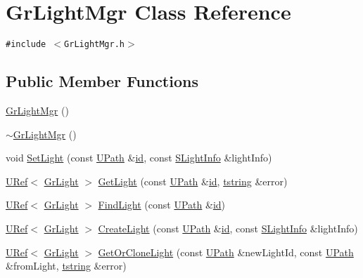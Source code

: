 \hypertarget{class_gr_light_mgr}{
\section{GrLightMgr Class Reference}
\label{class_gr_light_mgr}
}
{\tt \#include $<$GrLightMgr.h$>$}

\subsection*{Public Member Functions}
\begin{CompactItemize}
\item 
\hyperlink{class_gr_light_mgr_ea373f5ff2835f15c63767346023affa}{GrLightMgr} ()
\item 
\hyperlink{class_gr_light_mgr_61c1067fe1f0e57314c28363fb6a4d8b}{$\sim$GrLightMgr} ()
\item 
void \hyperlink{class_gr_light_mgr_aa93ff46c80e5fdbc8cecdfce13d5a99}{SetLight} (const \hyperlink{class_u_path}{UPath} \&\hyperlink{glext__bak_8h_58c2a664503e14ffb8f21012aabff3e9}{id}, const \hyperlink{struct_s_light_info}{SLightInfo} \&lightInfo)
\item 
\hyperlink{class_u_ref}{URef}$<$ \hyperlink{class_gr_light}{GrLight} $>$ \hyperlink{class_gr_light_mgr_6e2d2113c8d6092935f4f39ad9e1388d}{GetLight} (const \hyperlink{class_u_path}{UPath} \&\hyperlink{glext__bak_8h_58c2a664503e14ffb8f21012aabff3e9}{id}, \hyperlink{common__afx_8h_816fa58fd77499b0edb2c69ebe803d5c}{tstring} \&error)
\item 
\hyperlink{class_u_ref}{URef}$<$ \hyperlink{class_gr_light}{GrLight} $>$ \hyperlink{class_gr_light_mgr_8d8c949784428299e9046f856f48cda4}{FindLight} (const \hyperlink{class_u_path}{UPath} \&\hyperlink{glext__bak_8h_58c2a664503e14ffb8f21012aabff3e9}{id})
\item 
\hyperlink{class_u_ref}{URef}$<$ \hyperlink{class_gr_light}{GrLight} $>$ \hyperlink{class_gr_light_mgr_c0253a53f0d8c23131ac54a68217231a}{CreateLight} (const \hyperlink{class_u_path}{UPath} \&\hyperlink{glext__bak_8h_58c2a664503e14ffb8f21012aabff3e9}{id}, const \hyperlink{struct_s_light_info}{SLightInfo} \&lightInfo)
\item 
\hyperlink{class_u_ref}{URef}$<$ \hyperlink{class_gr_light}{GrLight} $>$ \hyperlink{class_gr_light_mgr_5ea84c63918a70154432b723c9b8cf15}{GetOrCloneLight} (const \hyperlink{class_u_path}{UPath} \&newLightId, const \hyperlink{class_u_path}{UPath} \&fromLight, \hyperlink{common__afx_8h_816fa58fd77499b0edb2c69ebe803d5c}{tstring} \&error)

\end{CompactItemize}
